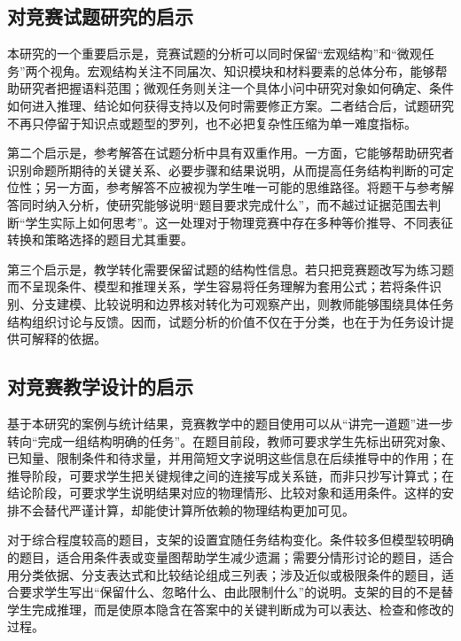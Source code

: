 \documentclass[
  12pt,
  a4paper]{ctexbook}
\begin{document}
\subsection{对竞赛试题研究的启示}\label{ux5bf9ux7adeux8d5bux8bd5ux9898ux7814ux7a76ux7684ux542fux793a}

本研究的一个重要启示是，竞赛试题的分析可以同时保留``宏观结构''和``微观任务''两个视角。宏观结构关注不同届次、知识模块和材料要素的总体分布，能够帮助研究者把握语料范围；微观任务则关注一个具体小问中研究对象如何确定、条件如何进入推理、结论如何获得支持以及何时需要修正方案。二者结合后，试题研究不再只停留于知识点或题型的罗列，也不必把复杂性压缩为单一难度指标。

第二个启示是，参考解答在试题分析中具有双重作用。一方面，它能够帮助研究者识别命题所期待的关键关系、必要步骤和结果说明，从而提高任务结构判断的可定位性；另一方面，参考解答不应被视为学生唯一可能的思维路径。将题干与参考解答同时纳入分析，使研究能够说明``题目要求完成什么''，而不越过证据范围去判断``学生实际上如何思考''。这一处理对于物理竞赛中存在多种等价推导、不同表征转换和策略选择的题目尤其重要。

第三个启示是，教学转化需要保留试题的结构性信息。若只把竞赛题改写为练习题而不呈现条件、模型和推理关系，学生容易将任务理解为套用公式；若将条件识别、分支建模、比较说明和边界核对转化为可观察产出，则教师能够围绕具体任务结构组织讨论与反馈。因而，试题分析的价值不仅在于分类，也在于为任务设计提供可解释的依据。

\subsection{对竞赛教学设计的启示}\label{ux5bf9ux7adeux8d5bux6559ux5b66ux8bbeux8ba1ux7684ux542fux793a}

基于本研究的案例与统计结果，竞赛教学中的题目使用可以从``讲完一道题''进一步转向``完成一组结构明确的任务''。在题目前段，教师可要求学生先标出研究对象、已知量、限制条件和待求量，并用简短文字说明这些信息在后续推导中的作用；在推导阶段，可要求学生把关键规律之间的连接写成关系链，而非只抄写计算式；在结论阶段，可要求学生说明结果对应的物理情形、比较对象和适用条件。这样的安排不会替代严谨计算，却能使计算所依赖的物理结构更加可见。

对于综合程度较高的题目，支架的设置宜随任务结构变化。条件较多但模型较明确的题目，适合用条件表或变量图帮助学生减少遗漏；需要分情形讨论的题目，适合用分类依据、分支表达式和比较结论组成三列表；涉及近似或极限条件的题目，适合要求学生写出``保留什么、忽略什么、由此限制什么''的说明。支架的目的不是替学生完成推理，而是使原本隐含在答案中的关键判断成为可以表达、检查和修改的过程。
\end{document}
